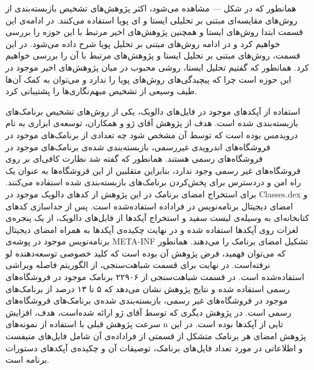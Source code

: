 همانطور که در شکل --- مشاهده می‌شود، اکثر پژوهش‌های تشخیص بازبسته‌بندی از روش‌های مقایسه‌ای مبتنی بر تحلیلی ایستا و ای پویا استفاده می‌کنند. در ادامه‌ی این قسمت ابتدا روش‌های ایستا و همچنین پژوهش‌های اخیر مرتبط با این حوزه را بررسی خواهیم کرد و در ادامه روش‌های مبتنی بر تحلیل پویا شرح داده می‌شود.
در این قسمت‌، روش‌های مبتنی بر تحلیل ایستا و پژوهش‌های مرتبط با آن را بررسی خواهیم کرد. همانطور که گفتیم تحلیل ایستا، روشی محبوب در میان پژوهش‌های اخیر موجود در این حوزه است چرا که پیچیدگی‌های روش‌های پویا را ندارد و می‌توان به کمک آن‌ها طیف وسیعی از تشخیص مبهم‌نگاری‌ها را پشتیبانی کرد.

استفاده از آپکد‌های موجود در فایل‌های دالویک، یکی از روش‌های تشخیص برنامک‌های بازبسته‌بندی شده است. هدف از پژوهش آقای ژو  و همکاران، توسعه‌ی ابزاری به نام درویدمس بوده است که توسط آن مشخص شود چه تعدادی از برنامک‌های موجود در فروشگاه‌های اندرویدی غیررسمی، بازبسته‌بندی شده‌ی برنامک‌های موجود در فروشگاه‌های رسمی هستند. همانطور که گفته شد نظارت کافی‌ای بر روی فروشگاه‌های غیر رسمی وجود ندارد، بنابراین متقلبین از این فروشگاه‌ها به عنوان یک راه امن و دردسترس برای پخش‌کردن برنامک‌های بازبسته‌بندی شده استفاده می‌کنند. برای استخراج امضا‌ی برنامک در این پژوهش از کد‌های دالویک موجود در Classes.dex و امضای دیجیتال برنامه‌نویس در فراداده‌ استفاده‌شده است. پس از جداسازی کد‌های کتابخانه‌ای به وسیله‌ی لیست سفید و استخراج آپکد‌ها از فایل‌های دالویک، از یک پنجره‌ی لغزات روی آپکد‌ها استفاده شده و در نهایت چکیده‌ی آپکد‌ها به همراه امضای دیجیتال برنامه‌نویس موجود در پوشه‌ی META-INF تشکیل امضا‌ی برنامک را می‌دهند. همانطور که می‌توان فهمید، فرض پژوهش آن بوده است که کلید خصوصی توسعه‌دهنده لو نرفته‌است. در نهایت برای قسمت‌ شباهت‌سنجی، از الگوریتم فاصله ویراشی استفاده‌شده است. در قسمت شباهت‌سنجی از ۲۲۹۰۶ برنامک موجود در فروشگاه‌های رسمی استفاده شده‌ و نتایج پژوهش نشان می‌دهد که ۵ تا ۱۳ درصد از برنامک‌های موجود در فروشگاه‌های غیر رسمی، بازبسته‌بندی شده‌ی برنامک‌های فروشگاه‌های رسمی است. در پژوهش دیگری که توسط آقای ژو ارائه شده‌است، هدف، افزایش سرعت پژوهش‌ قبلی با استفاده از نمونه‌های n تایی از آپکد‌ها بوده است. در این پژوهش امضای هر برنامک متشکل از قسمتی از فراداده‌ی آن شامل فایل‌های منیفست و اطلاعاتی در مورد تعداد فایل‌های برنامک، توصیفات آن و چکیده‌ی آپکد‌های دستورات برنامه‌ است.
















